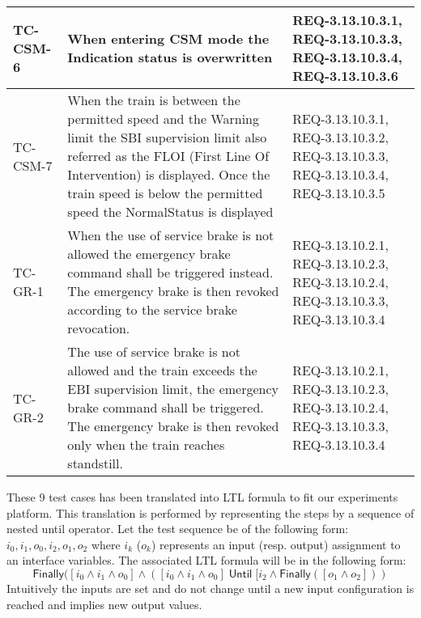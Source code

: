 \begin{table}
\begin{tabular}{lp{}p{4.9cm}}
TC-CSM-6 & 
When entering CSM mode the Indication status is overwritten &
REQ-3.13.10.3.1, REQ-3.13.10.3.3,\newline
REQ-3.13.10.3.4, REQ-3.13.10.3.6 \\ \hline
TC-CSM-7 & 
When the train is between the permitted speed and the Warning limit
the  SBI  supervision limit also referred
as the FLOI (First Line Of Intervention) is 
displayed. Once the train speed is below 
the permitted speed the {\sf NormalStatus} is displayed  & 
REQ-3.13.10.3.1, REQ-3.13.10.3.2,\newline
REQ-3.13.10.3.3, REQ-3.13.10.3.4, \newline
REQ-3.13.10.3.5\\ \hline
TC-GR-1 & 
When the use of service brake is not allowed the emergency brake
command shall be triggered instead. The emergency brake is then revoked
according to the service brake revocation.& 
REQ-3.13.10.2.1, REQ-3.13.10.2.3,\newline
REQ-3.13.10.2.4, REQ-3.13.10.3.3,\newline
REQ-3.13.10.3.4 \\ \hline
TC-GR-2 & 
The use of service brake is not allowed and the train exceeds the EBI
supervision limit, the emergency brake command shall be triggered. 
The emergency brake is then revoked only when the train reaches
standstill.&
REQ-3.13.10.2.1, REQ-3.13.10.2.3,\newline
REQ-3.13.10.2.4, REQ-3.13.10.3.3,\newline
REQ-3.13.10.3.4 \\ 
\hline\hline
\end{tabular}
\normalsize
\end{table}




These 9 test cases has been translated into LTL formula to fit our
experiments platform. This translation is performed by representing
the steps by a sequence of nested until operator.
Let the test sequence be of the following form: $i_0,i_1,o_0,i_2, o_1,o_2$ where
$i_k$ ($o_k$) represents an input (resp. output) assignment to an interface
variables. The associated LTL formula will be in the following form:\\
$$ \mathsf{Finally}( [i_0 \wedge i_1 \wedge o_0] \wedge ([i_0 \wedge i_1 \wedge
o_0] \; \mathsf{Until} \;[i_2 \wedge \mathsf{Finally}([o_1 \wedge o_2]) ) $$
Intuitively the inputs are set and do not change until a new input configuration
is reached and implies new  output values.

